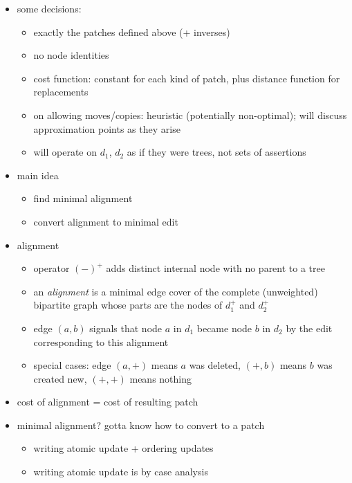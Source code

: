 \documentclass{article}
\begin{document}
\begin{itemize}
\begin{itemize}
        \end{itemize}
    \item some decisions:
        \begin{itemize}
            \item exactly the patches defined above (+ inverses)
            \item no node identities
            \item cost function: constant for each kind of patch, plus
                distance function for replacements
            \item on allowing moves/copies: heuristic (potentially
                non-optimal); will discuss approximation points as they
                arise
            \item will operate on $d_1$, $d_2$ as if they were trees, not
                sets of assertions
        \end{itemize}
    \item main idea
        \begin{itemize}
            \item find minimal alignment
            \item convert alignment to minimal edit
        \end{itemize}
    \item alignment
        \begin{itemize}
            \item operator $(-)^+$ adds distinct internal node with no
                parent to a tree
            \item an \emph{alignment} is a minimal edge cover of the
                complete (unweighted) bipartite graph whose parts are the
                nodes of $d_1^+$ and $d_2^+$
            \item edge $(a,b)$ signals that node $a$ in $d_1$ became node
                $b$ in $d_2$ by the edit corresponding to this alignment
            \item special cases: edge $(a,+)$ means $a$ was deleted, $(+,b)$
                means $b$ was created new, $(+,+)$ means nothing
        \end{itemize}
    \item cost of alignment = cost of resulting patch
    \item minimal alignment? gotta know how to convert to a patch
        \begin{itemize}
            \item writing atomic update + ordering updates
            \item writing atomic update is by case analysis

\end{itemize}
\end{itemize}
\end{document}

